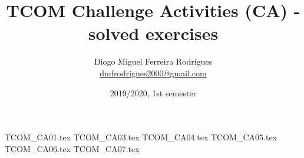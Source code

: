 \documentclass{tcom}
\title{TCOM Challenge Activities (CA) - solved exercises}
\author{Diogo Miguel Ferreira Rodrigues \\ \href{mailto:dmfrodrigues2000@gmail.com}{dmfrodrigues2000@gmail.com}}
\date{2019/2020, 1st semester}
\begin{document}
\begingroup
	\maketitle
	\let\clearpage\relax
	\setcounter{tocdepth}{2}
	\tableofcontents
\endgroup
{TCOM_CA01.tex}
{TCOM_CA03.tex}
{TCOM_CA04.tex}
{TCOM_CA05.tex}
{TCOM_CA06.tex}
{TCOM_CA07.tex}
\end{document}
